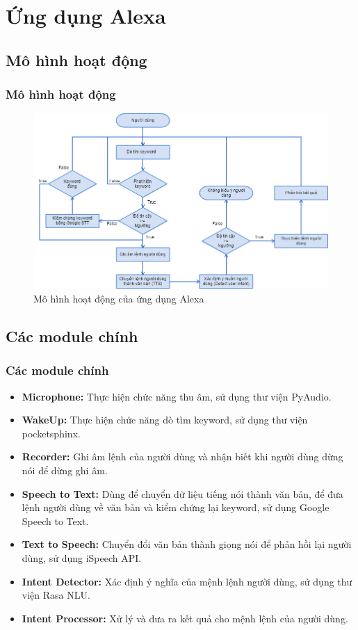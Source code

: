 \documentclass{beamer}
\begin{document}
\section{Ứng dụng Alexa}

\subsection{Mô hình hoạt động}
\begin{frame}
\frametitle{Mô hình hoạt động}
\begin{figure}
\centering
\includegraphics[scale=0.65]{system_flowchart}
\caption{Mô hình hoạt động của ứng dụng Alexa}
\end{figure}
\end{frame}

\subsection{Các module chính}
\begin{frame}
\frametitle{Các module chính}
\begin{itemize}
    \item \textbf{Microphone:} Thực hiện chức năng thu âm, sử dụng thư viện PyAudio.
    \item \textbf{WakeUp:} Thực hiện chức năng dò tìm keyword, sử dụng thư viện pocketsphinx.
    \item \textbf{Recorder:} Ghi âm lệnh của người dùng và nhận biết khi người dùng dừng nói để dừng ghi âm.
    \item \textbf{Speech to Text:} Dùng để chuyển dữ liệu tiếng nói thành văn bản, để đưa lệnh người dùng về văn bản và kiểm chứng lại keyword, sử dụng Google Speech to Text.
    \item \textbf{Text to Speech:} Chuyển đổi văn bản thành giọng nói để phản hồi lại người dùng, sử dụng iSpeech API.
    \item \textbf{Intent Detector:} Xác định ý nghĩa của mệnh lệnh người dùng, sử dụng thư viện Rasa NLU.
    \item \textbf{Intent Processor:} Xử lý và đưa ra kết quả cho mệnh lệnh của người dùng.
\end{itemize}
\end{frame}
\end{document}
